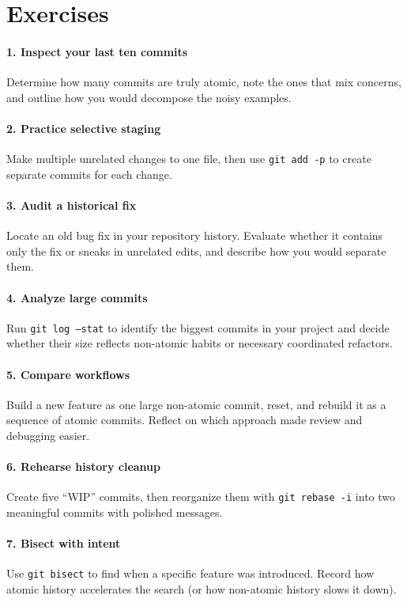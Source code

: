 \section*{Exercises}

\paragraph{1. Inspect your last ten commits} Determine how many commits are truly atomic, note the ones that mix concerns, and outline how you would decompose the noisy examples.

\paragraph{2. Practice selective staging} Make multiple unrelated changes to one file, then use \texttt{git add -p} to create separate commits for each change.

\paragraph{3. Audit a historical fix} Locate an old bug fix in your repository history. Evaluate whether it contains only the fix or sneaks in unrelated edits, and describe how you would separate them.

\paragraph{4. Analyze large commits} Run \texttt{git log --stat} to identify the biggest commits in your project and decide whether their size reflects non-atomic habits or necessary coordinated refactors.

\paragraph{5. Compare workflows} Build a new feature as one large non-atomic commit, reset, and rebuild it as a sequence of atomic commits. Reflect on which approach made review and debugging easier.

\paragraph{6. Rehearse history cleanup} Create five ``WIP'' commits, then reorganize them with \texttt{git rebase -i} into two meaningful commits with polished messages.

\paragraph{7. Bisect with intent} Use \texttt{git bisect} to find when a specific feature was introduced. Record how atomic history accelerates the search (or how non-atomic history slows it down).

